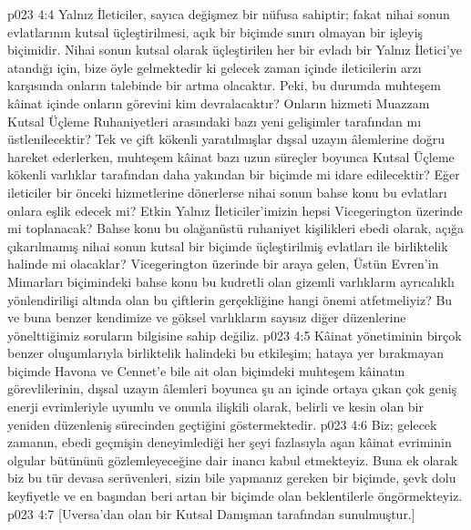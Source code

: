 \vs p023 4:4 Yalnız İleticiler, sayıca değişmez bir nüfusa sahiptir; fakat nihai sonun evlatlarının kutsal üçleştirilmesi, açık bir biçimde sınırı olmayan bir işleyiş biçimidir. Nihai sonun kutsal olarak üçleştirilen her bir evladı bir Yalnız İletici’ye atandığı için, bize öyle gelmektedir ki gelecek zaman içinde ileticilerin arzı karşısında onların talebinde bir artma olacaktır. Peki, bu durumda muhteşem kâinat içinde onların görevini kim devralacaktır? Onların hizmeti Muazzam Kutsal Üçleme Ruhaniyetleri arasındaki bazı yeni gelişimler tarafından mı üstlenilecektir? Tek ve çift kökenli yaratılmışlar dışsal uzayın âlemlerine doğru hareket ederlerken, muhteşem kâinat bazı uzun süreçler boyunca Kutsal Üçleme kökenli varlıklar tarafından daha yakından bir biçimde mi idare edilecektir? Eğer ileticiler bir önceki hizmetlerine dönerlerse nihai sonun bahse konu bu evlatları onlara eşlik edecek mi? Etkin Yalnız İleticiler’imizin hepsi Vicegerington üzerinde mi toplanacak? Bahse konu bu olağanüstü ruhaniyet kişilikleri ebedi olarak, açığa çıkarılmamış nihai sonun kutsal bir biçimde üçleştirilmiş evlatları ile birliktelik halinde mi olacaklar? Vicegerington üzerinde bir araya gelen, Üstün Evren’in Mimarları biçimindeki bahse konu bu kudretli olan gizemli varlıkların ayrıcalıklı yönlendirilişi altında olan bu çiftlerin gerçekliğine hangi önemi atfetmeliyiz? Bu ve buna benzer kendimize ve göksel varlıkların sayısız diğer düzenlerine yönelttiğimiz soruların bilgisine sahip değiliz.
\vs p023 4:5 Kâinat yönetiminin birçok benzer oluşumlarıyla birliktelik halindeki bu etkileşim; hataya yer bırakmayan biçimde Havona ve Cennet’e bile ait olan biçimdeki muhteşem kâinatın görevlilerinin, dışsal uzayın âlemleri boyunca şu an içinde ortaya çıkan çok geniş enerji evrimleriyle uyumlu ve onunla ilişkili olarak, belirli ve kesin olan bir yeniden düzenleniş sürecinden geçtiğini göstermektedir.
\vs p023 4:6 Biz; gelecek zamanın, ebedi geçmişin deneyimlediği her şeyi fazlasıyla aşan kâinat evriminin olgular bütününü gözlemleyeceğine dair inancı kabul etmekteyiz. Buna ek olarak biz bu tür devasa serüvenleri, sizin bile yapmanız gereken bir biçimde, şevk dolu keyfiyetle ve en başından beri artan bir biçimde olan beklentilerle öngörmekteyiz.
\vs p023 4:7 [Uversa’dan olan bir Kutsal Danışman tarafından sunulmuştur.]
